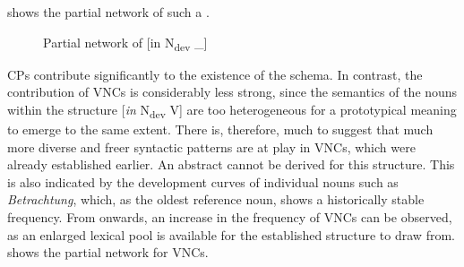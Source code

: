 \documentclass[output=paper,colorlinks,citecolor=brown]{langscibook}
\begin{document}
  shows the partial network of such a .

\begin{figure}
\centering
{}
\caption{Partial network of [in \textup{N}\textup{\textsubscript{dev}} \textup{\_]}}
\label{fig:fleissner:13}
\end{figure}

CPs contribute significantly to the existence of the schema. In contrast, the contribution of VNCs is considerably less strong, since the semantics of the nouns within the structure [\textit{in} N\textsubscript{dev} V] are too heterogeneous for a prototypical meaning to emerge to the same extent. There is, therefore, much to suggest that much more diverse and freer syntactic patterns are at play in VNCs, which were already established earlier. An abstract  cannot be derived for this structure. This is also indicated by the development curves of individual nouns such as \textit{Betrachtung}, which, as the oldest reference noun, shows a historically stable frequency. From  onwards, an increase in the frequency of VNCs can be observed, as an enlarged lexical pool is available for the established structure to draw from.  shows the partial network for VNCs.
\end{document}
